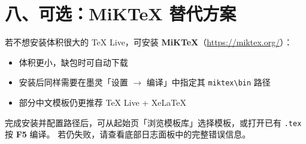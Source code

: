 \documentclass[UTF8,11pt]{article}
\begin{document}
\section*{八、可选：MiKTeX 替代方案}
若不想安装体积很大的 TeX Live，可安装 \textbf{MiKTeX}（\url{https://miktex.org/}）：
\begin{itemize}
  \item 体积更小，缺包时可自动下载
  \item 安装后同样需要在墨灵「设置 $\rightarrow$ 编译」中指定其 \texttt{miktex\textbackslash bin} 路径
  \item 部分中文模板仍更推荐 TeX Live + XeLaTeX
\end{itemize}

\vspace{1em}
\begin{center}
\colorbox{accent!8}{\parbox{0.96\textwidth}{%
完成安装并配置路径后，可从起始页「浏览模板库」选择模板，或打开已有 \texttt{.tex} 按 \textbf{F5} 编译。
若仍失败，请查看底部日志面板中的完整错误信息。
}}
\end{center}
\end{document}
